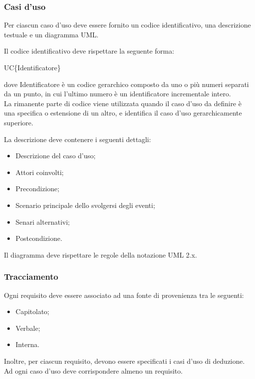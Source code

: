 \subsubsection{Casi d'uso}
Per ciascun caso d'uso deve essere fornito un codice identificativo, una descrizione testuale e un diagramma UML.

\begin{flushleft}
Il codice identificativo deve rispettare la seguente forma:
\end{flushleft}

\begin{center}UC\{Identificatore\}\end{center}
dove Identificatore è un codice gerarchico composto da uno o più numeri separati da un punto, in cui l'ultimo numero è un identificatore incrementale intero.\\
La rimanente parte di codice viene utilizzata quando il caso d'uso da definire è una specifica o estensione di un altro, e identifica il caso d'uso gerarchicamente superiore.

\begin{flushleft}
La descrizione deve contenere i seguenti dettagli:
\end{flushleft}

\begin{itemize}
\item Descrizione del caso d'uso;
\item Attori coinvolti;
\item Precondizione;
\item Scenario principale dello svolgersi degli eventi;
\item Senari alternativi;
\item Postcondizione.
\end{itemize}

\begin{flushleft}
Il diagramma deve rispettare le regole della notazione UML 2.x.
\end{flushleft}

\subsubsection{Tracciamento}
Ogni requisito deve essere associato ad una fonte di provenienza tra le seguenti:

\begin{itemize}
\item Capitolato;
\item Verbale;
\item Interna.
\end{itemize}
Inoltre, per ciascun requisito, devono essere specificati i casi d'uso di deduzione.\\
Ad ogni caso d'uso deve corrispondere almeno un requisito.

